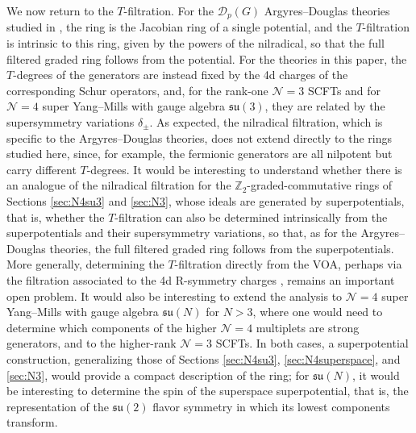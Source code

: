\documentclass[12pt]{article}
\numberwithin{equation}{section}
\numberwithin{figure}{section}
\theoremstyle{plain}
\theoremstyle{definition}
\begin{document}
We now return to the $T$-filtration. For the $\mathcal{D}_p(G)$ Argyres--Douglas theories studied in \cite{Kang:2026ney}, the ring is the Jacobian ring of a single potential, and the $T$-filtration is intrinsic to this ring, given by the powers of the nilradical, so that the full filtered graded ring follows from the potential. For the theories in this paper, the $T$-degrees of the generators are instead fixed by the 4d charges of the corresponding Schur operators, and, for the rank-one $\mathcal{N}=3$ SCFTs and for $\mathcal{N}=4$ super Yang--Mills with gauge algebra $\mathfrak{su}(3)$, they are related by the supersymmetry variations $\delta_\pm$. As expected, the nilradical filtration, which is specific to the Argyres--Douglas theories, does not extend directly to the rings studied here, since, for example, the fermionic generators are all nilpotent but carry different $T$-degrees. It would be interesting to understand whether there is an analogue of the nilradical filtration for the $\mathbb{Z}_2$-graded-commutative rings of Sections \ref{sec:N4su3} and \ref{sec:N3}, whose ideals are generated by superpotentials, that is, whether the $T$-filtration can also be determined intrinsically from the superpotentials and their supersymmetry variations, so that, as for the Argyres--Douglas theories, the full filtered graded ring follows from the superpotentials. More generally, determining the $T$-filtration directly from the VOA, perhaps via the filtration associated to the 4d R-symmetry charges \cite{Song:2016yfd,Beem:2019tfp,ArabiArdehali:2025fad,Beem:2026lkq}, remains an important open problem. It would also be interesting to extend the analysis to $\mathcal{N}=4$ super Yang--Mills with gauge algebra $\mathfrak{su}(N)$ for $N > 3$, where one would need to determine which components of the higher $\mathcal{N}=4$ multiplets are strong generators, and to the higher-rank $\mathcal{N}=3$ SCFTs. In both cases, a superpotential construction, generalizing those of Sections \ref{sec:N4su3}, \ref{sec:N4superspace}, and \ref{sec:N3}, would provide a compact description of the ring; for $\mathfrak{su}(N)$, it would be interesting to determine the spin of the superspace superpotential, that is, the representation of the $\mathfrak{su}(2)$ flavor symmetry in which its lowest components transform.
\end{document}
